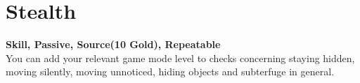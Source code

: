 \section{Stealth}\label{sec:stealth}
\textbf{Skill, Passive, Source(10 Gold), Repeatable}\\
You can add your relevant game mode level to checks concerning staying hidden, moving silently, moving unnoticed, hiding objects and subterfuge in general.